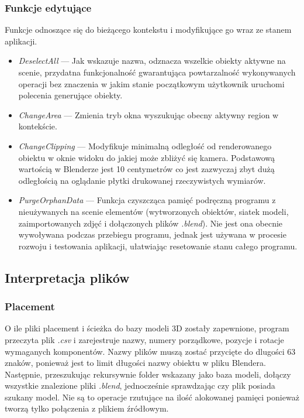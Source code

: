 \documentclass[brudnopis]{xmgr}
\begin{document}
\subsubsection{Funkcje edytujące}
Funkcje odnoszące się do bieżącego kontekstu i modyfikujące go wraz ze stanem aplikacji.
\begin{itemize}
\item \emph{DeselectAll} --- Jak wskazuje nazwa, odznacza wszelkie obiekty aktywne na scenie, przydatna funkcjonalność gwarantująca powtarzalność wykonywanych operacji bez znaczenia w jakim stanie początkowym użytkownik uruchomi polecenia generujące obiekty.
\item \emph{ChangeArea} --- Zmienia tryb okna wyszukując obecny aktywny region w kontekście.
\item \emph{ChangeClipping} --- Modyfikuje minimalną odległość od renderowanego obiektu w oknie widoku do jakiej może zbliżyć się kamera. Podstawową wartością w Blenderze jest 10 centymetrów co jest zazwyczaj zbyt dużą odległością na oglądanie płytki drukowanej rzeczywistych wymiarów.
\item \emph{PurgeOrphanData} --- Funkcja czyszcząca pamięć podręczną programu z nieużywanych na scenie elementów (wytworzonych obiektów, siatek modeli, zaimportowanych zdjęć i dołączonych plików \emph{.blend}). Nie jest ona obecnie wywoływana podczas przebiegu programu, jednak jest używana w procesie rozwoju i testowania aplikacji, ułatwiając resetowanie stanu całego programu.
\end{itemize}
\subsection{Interpretacja plików}
\subsubsection{Placement}
O ile pliki placement i ścieżka do bazy modeli 3D zostały zapewnione, program przeczyta plik \emph{.csv} i zarejestruje nazwy, numery porządkowe, pozycje i rotacje wymaganych komponentów. Nazwy plików muszą zostać przycięte do dlugości 63 znaków, ponieważ jest to limit długości nazwy obiektu w pliku Blendera. Następnie, przeszukując rekursywnie folder wskazany jako baza modeli, dołączy wszystkie znalezione pliki \emph{.blend}, jednocześnie sprawdzając czy plik posiada szukany model. Nie są to operacje rzutujące na ilość alokowanej pamięci ponieważ tworzą tylko połączenia z plikiem źródłowym.
\end{document}

